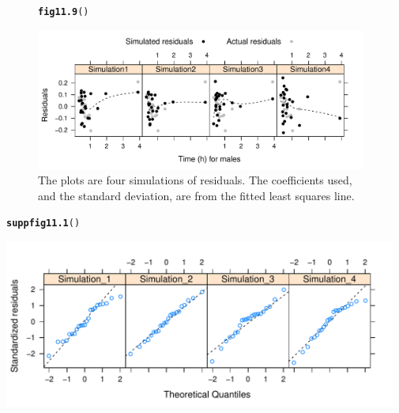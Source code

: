 \documentclass[12pt, a4paper,  BCOR=8.25mm, DIV=15]{scrartcl}\usepackage[]{graphicx}\usepackage[]{color}
\makeatletter
\newcommand{\hlstd}[1]{\textcolor[rgb]{0.345,0.345,0.345}{#1}}%
\newcommand{\hlkwd}[1]{\textcolor[rgb]{0.737,0.353,0.396}{\textbf{#1}}}%
\newenvironment{kframe}{%
 \def\at@end@of@kframe{}%
 \ifinner\ifhmode%
  \def\at@end@of@kframe{\end{minipage}}%
  \begin{minipage}{\columnwidth}%
 \fi\fi%
 \def\FrameCommand##1{\hskip\@totalleftmargin \hskip-\fboxsep
 \colorbox{shadecolor}{##1}\hskip-\fboxsep
     \hskip-\linewidth \hskip-\@totalleftmargin \hskip\columnwidth}%
 \MakeFramed {\advance\hsize-\width
   \@totalleftmargin\z@ \linewidth\hsize
   \@setminipage}}%
 {\par\unskip\endMakeFramed%
 \at@end@of@kframe}
\newenvironment{knitrout}{}{} %
\makeatother
\begin{document}
\begin{figure}[H]
\begin{knitrout}
\color{fgcolor}\begin{kframe}
\begin{alltt}
\hlkwd{fig11.9}\hlstd{()}
\end{alltt}
\end{kframe}

{\centering \includegraphics[width=0.97\textwidth]{figs/reg-simscat-11_9-1} 

}



\end{knitrout}
\caption{The plots are four simulations of residuals.  The coefficients
  used, and the standard deviation, are from the fitted least squares
  line.\label{fig:4sim-mftimeres1}}
\end{figure}

\begin{suppfigure}[H]
\begin{knitrout}
\color{fgcolor}\begin{kframe}
\begin{alltt}
\hlkwd{suppfig11.1}\hlstd{()}
\end{alltt}
\end{kframe}

{\centering \includegraphics[width=0.97\textwidth]{figs/reg-which2-s11_1e-1} 

}



\end{knitrout}
\caption{Normal probability plots for four sets of simulated
  data.}\label{fig:mftimesimdiag2}
\end{suppfigure}
\end{document}
